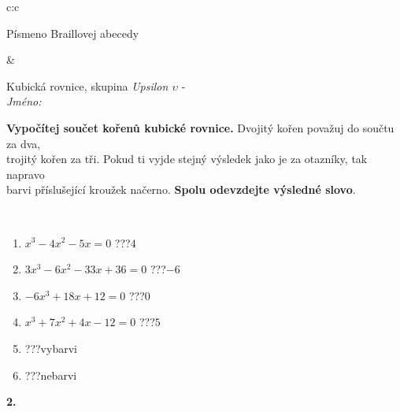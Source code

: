 \documentclass[10pt]{report}
\begin{document}
\begin{tabular}{c:c}
\begin{minipage}[c][104.5mm][t]{0.5\linewidth}
\begin{center}
\begin{minipage}{0.20\linewidth}
\begin{center}
{\small Písmeno Braillovej abecedy}
\end{center}
\end{minipage}
\end{center}
\end{minipage}
&
\begin{minipage}[c][104.5mm][t]{0.5\linewidth}
\begin{center}
\vspace{7mm}
{\huge Kubická rovnice, skupina \textit{Upsilon $\upsilon$} -}\\[5mm]
\textit{Jméno:}\phantom{xxxxxxxxxxxxxxxxxxxxxxxxxxxxxxxxxxxxxxxxxxxxxxxxxxxxxxxxxxxxxxxxx}\\[5mm]
\begin{minipage}{0.95\linewidth}
\begin{center}
\textbf{Vypočítej součet kořenů kubické rovnice.} Dvojitý kořen považuj do součtu za dva,\\trojitý kořen za tři. Pokud ti vyjde stejný výsledek jako je za otazníky, tak napravo\\barvi příslušející kroužek načerno. \textbf{Spolu odevzdejte výsledné slovo}.
\end{center}
\end{minipage}
\\[1mm]
\begin{minipage}{0.79\linewidth}
\begin{center}
\begin{varwidth}{\linewidth}
\begin{enumerate}
\Large
\item $x^3-4x^2-5x=0$\quad \dotfill\; ???\;\dotfill \quad $4$
\item $3x^3-6x^2-33x+36=0$\quad \dotfill\; ???\;\dotfill \quad $-6$
\item $-6x^3+18x+12=0$\quad \dotfill\; ???\;\dotfill \quad $0$
\item $x^3+7x^2+4x-12=0$\quad \dotfill\; ???\;\dotfill \quad $5$
\item \quad \dotfill\; ???\;\dotfill \quad vybarvi
\item \quad \dotfill\; ???\;\dotfill \quad nebarvi
\end{enumerate}
\end{varwidth}
\end{center}
\end{minipage}
\begin{minipage}{0.20\linewidth}
\begin{center}
{\Huge\bfseries 2.} \\[2mm]

\end{center}
\end{minipage}
\end{center}
\end{minipage}
\end{tabular}
\end{document}

